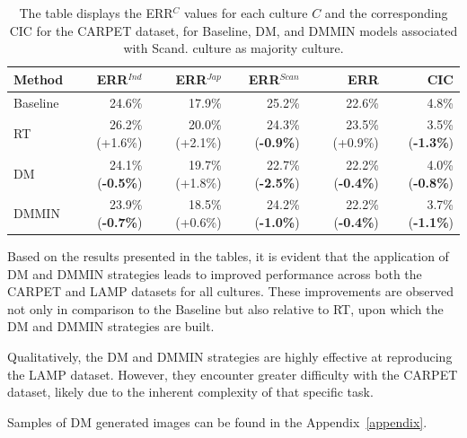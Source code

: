 %
%
\begin{table}
\centering
\begin{tabular}{lrrrrr}
\toprule
\textbf{Method} & \textbf{ERR$^{Ind}$} & \textbf{ERR$^{Jap}$} & \textbf{ERR$^{Scan}$} & \textbf{ERR} & \textbf{CIC} \\
\midrule
Baseline     & 24.6\% & 17.9\% & 25.2\% & 22.6\% & 4.8\% \\
RT           & 26.2\% (+1.6\%) & 20.0\% (+2.1\%) & 24.3\% (\textbf{-0.9\%}) & 23.5\% (+0.9\%) & 3.5\% (\textbf{-1.3\%}) \\
DM           & 24.1\% (\textbf{-0.5\%}) & 19.7\% (+1.8\%) & 22.7\% (\textbf{-2.5\%}) & 22.2\% (\textbf{-0.4\%}) & 4.0\% (\textbf{-0.8\%}) \\
DMMIN        & 23.9\% (\textbf{-0.7\%}) & 18.5\% (+0.6\%) & 24.2\% (\textbf{-1.0\%}) & 22.2\% (\textbf{-0.4\%}) & 3.7\% (\textbf{-1.1\%}) \\
\bottomrule
\end{tabular}
\caption{The table displays the ERR$^C$ values for each culture $C$ and the corresponding CIC for the CARPET dataset, for Baseline, DM, and DMMIN models associated with Scand. culture as majority culture.}
\label{ch3:tab:diffCS}
\end{table}
%
Based on the results presented in the tables, it is evident that the application of DM and DMMIN strategies leads to improved performance across both the CARPET and LAMP datasets for all cultures. These improvements are observed not only in comparison to the Baseline but also relative to RT, upon which the DM and DMMIN strategies are built.

Qualitatively, the DM and DMMIN strategies are highly effective at reproducing the LAMP dataset. However, they encounter greater difficulty with the CARPET dataset, likely due to the inherent complexity of that specific task.

Samples of DM generated images can be found in the Appendix~\ref{appendix}.

